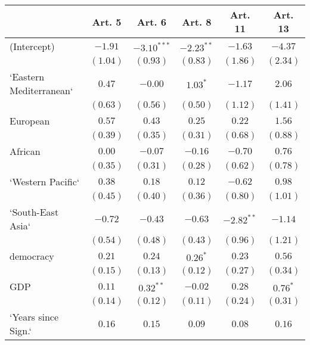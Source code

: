 
\begin{table}[!h]
\begin{center}
\begin{tabular}{l c c c c c }
\toprule
 & Art. 5 & Art. 6 & Art. 8 & Art. 11 & Art. 13 \\
\midrule
(Intercept)             & $-1.91$      & $-3.10^{***}$ & $-2.23^{**}$ & $-1.63$      & $-4.37$      \\
                        & $(1.04)$     & $(0.93)$      & $(0.83)$     & $(1.86)$     & $(2.34)$     \\
`Eastern Mediterranean` & $0.47$       & $-0.00$       & $1.03^{*}$   & $-1.17$      & $2.06$       \\
                        & $(0.63)$     & $(0.56)$      & $(0.50)$     & $(1.12)$     & $(1.41)$     \\
European                & $0.57$       & $0.43$        & $0.25$       & $0.22$       & $1.56$       \\
                        & $(0.39)$     & $(0.35)$      & $(0.31)$     & $(0.68)$     & $(0.88)$     \\
African                 & $0.00$       & $-0.07$       & $-0.16$      & $-0.70$      & $0.76$       \\
                        & $(0.35)$     & $(0.31)$      & $(0.28)$     & $(0.62)$     & $(0.78)$     \\
`Western Pacific`       & $0.38$       & $0.18$        & $0.12$       & $-0.62$      & $0.98$       \\
                        & $(0.45)$     & $(0.40)$      & $(0.36)$     & $(0.80)$     & $(1.01)$     \\
`South-East Asia`       & $-0.72$      & $-0.43$       & $-0.63$      & $-2.82^{**}$ & $-1.14$      \\
                        & $(0.54)$     & $(0.48)$      & $(0.43)$     & $(0.96)$     & $(1.21)$     \\
democracy               & $0.21$       & $0.24$        & $0.26^{*}$   & $0.23$       & $0.56$       \\
                        & $(0.15)$     & $(0.13)$      & $(0.12)$     & $(0.27)$     & $(0.34)$     \\
GDP                     & $0.11$       & $0.32^{**}$   & $-0.02$      & $0.28$       & $0.76^{*}$   \\
                        & $(0.14)$     & $(0.12)$      & $(0.11)$     & $(0.24)$     & $(0.31)$     \\
`Years since Sign.`     & $0.16$       & $0.15$        & $0.09$       & $0.08$       & $0.16$       \\

\end{tabular}
\end{center}
\end{table}
